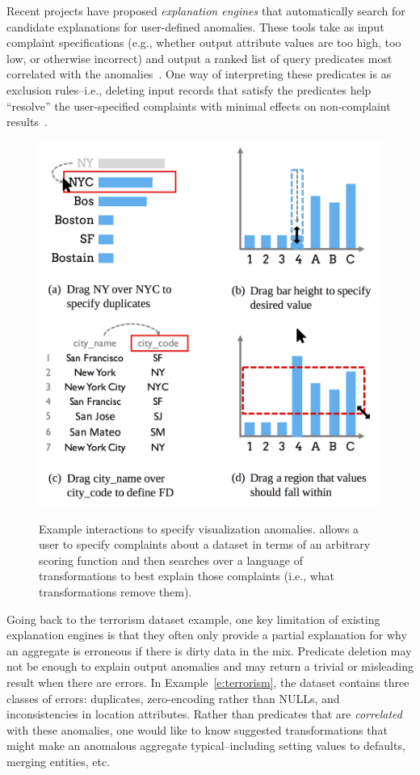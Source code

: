 Recent projects have proposed \emph{explanation engines} that automatically search for candidate explanations for user-defined anomalies.  These tools take as input complaint specifications (e.g., whether output attribute values are too high, too low, or otherwise incorrect) and output a ranked list of query predicates most correlated with the anomalies~\cite{scorpion,DBLP:conf/sigmod/ChalamallaIOP14,bailis2016macrobase,roy2015explaining}.  One way of interpreting these predicates is as exclusion rules--i.e., deleting input records that satisfy the predicates help ``resolve'' the user-specified complaints with minimal effects on non-complaint results~\cite{scorpion}.  

\begin{figure}[tb]
\centering
\includegraphics[width=.8\columnwidth]{figures/ui.png}
\label{f:ui}
\caption{Example interactions to specify visualization anomalies. \sys allows a user to specify complaints about a dataset in terms of an arbitrary scoring function and then searches over a language of transformations to best explain those complaints (i.e., what transformations remove them).}
\end{figure}

Going back to the terrorism dataset example, one key limitation of existing explanation engines is that they often only provide a partial explanation for why an aggregate is erroneous if there is dirty data in the mix. Predicate deletion may not be enough to explain output anomalies and may return a trivial or misleading result when there are errors. In Example~\ref{e:terrorism}, the dataset contains three classes of errors:  duplicates, zero-encoding rather than NULLs, and inconsistencies in location attributes. Rather than predicates that are \emph{correlated} with these anomalies, one would like to know suggested transformations that might make an anomalous aggregate typical--including setting values to defaults, merging entities, etc. 

